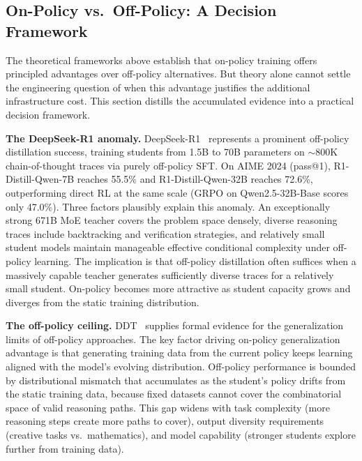\documentclass{article} %
\begin{document}
\subsection{On-Policy vs.\ Off-Policy: A Decision Framework}
\label{subsec:on_vs_off}

The theoretical frameworks above establish that on-policy training offers principled advantages over off-policy alternatives. But theory alone cannot settle the engineering question of when this advantage justifies the additional infrastructure cost. This section distills the accumulated evidence into a practical decision framework.

\textbf{The DeepSeek-R1 anomaly.} DeepSeek-R1~\citep{2501.12948} represents a prominent off-policy distillation success, training students from 1.5B to 70B parameters on $\sim$800K chain-of-thought traces via purely off-policy SFT. On AIME 2024 (pass@1), R1-Distill-Qwen-7B reaches 55.5\% and R1-Distill-Qwen-32B reaches 72.6\%, outperforming direct RL at the same scale (GRPO on Qwen2.5-32B-Base scores only 47.0\%). Three factors plausibly explain this anomaly. An exceptionally strong 671B MoE teacher covers the problem space densely, diverse reasoning traces include backtracking and verification strategies, and relatively small student models maintain manageable effective conditional complexity under off-policy learning. The implication is that off-policy distillation often suffices when a massively capable teacher generates sufficiently diverse traces for a relatively small student. On-policy becomes more attractive as student capacity grows and diverges from the static training distribution.

\textbf{The off-policy ceiling.} DDT~\citep{2602.12222} supplies formal evidence for the generalization limits of off-policy approaches. The key factor driving on-policy generalization advantage is that generating training data from the current policy keeps learning aligned with the model's evolving distribution. Off-policy performance is bounded by distributional mismatch that accumulates as the student's policy drifts from the static training data, because fixed datasets cannot cover the combinatorial space of valid reasoning paths. This gap widens with task complexity (more reasoning steps create more paths to cover), output diversity requirements (creative tasks vs.\ mathematics), and model capability (stronger students explore further from training data).
\end{document}

